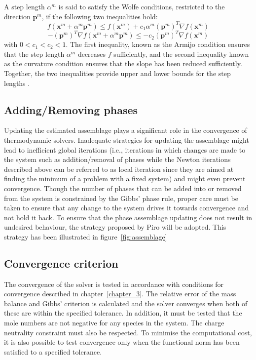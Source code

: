 	A step length $\alpha^m$ is said to satisfy the Wolfe conditions, restricted to the direction $\mathbf{p}^m$, if the following two inequalities hold:
	\begin{equation}
		f\left(\mathbf{x}^m + \alpha^m \mathbf{p}^m\right) \leq f\left(\mathbf{x}^m \right) + c_1 \alpha^m \left(\mathbf{p}^m\right)^T \nabla f\left(\mathbf{x}^m \right)
	\end{equation}
	\begin{equation}
		- \left(\mathbf{p}^m\right)^T \nabla f\left(\mathbf{x}^m + \alpha^m \mathbf{p}^m\right) \leq - c_2 \left(\mathbf{p}^m\right)^T \nabla f\left(\mathbf{x}^m \right)
	\end{equation}
	with $0 < c_1 < c_2 < 1$. The first inequality, known as the Armijo condition ensures that the step length $\alpha^m$ decreases $f$ sufficiently, and the second inequality known as the curvature condition ensures that the slope has been reduced sufficiently. Together, the two inequalities provide upper and lower bounds for the step lengths \cite{Nocedal06}.

	\subsection{Adding/Removing phases}
		Updating the estimated assemblage plays a significant role in the convergence of thermodynamic solvers. Inadequate strategies for updating the assemblage might lead to inefficient global iterations (i.e., iterations in which changes are made to the system such as addition/removal of phases while the Newton iterations described above can be referred to as local iteration since they are aimed at finding the minimum of a problem with a fixed system) and might even prevent convergence. Though the number of phases that can be added into or removed from the system is constrained by the Gibbs' phase rule, proper care must be taken to ensure that any change to the system drives it towards convergence and not hold it back. To ensure that the phase assemblage updating does not result in undesired behaviour, the strategy proposed by Piro \cite{Piro17} will be adopted. This strategy has been illustrated in figure~\ref{fig:assemblage}

	\subsection{Convergence criterion}
	The convergence of the solver is tested in accordance with conditions for convergence described in chapter~\ref{chapter_3}. The relative error of the mass balance and Gibbs' criterion is calculated  and the solver converges when both of these are within the specified tolerance. In addition, it must be tested that the mole numbers are not negative for any species in the system. The charge neutrality constraint must also be respected.  To minimise the computational cost, it is also possible to test convergence only when the functional norm has been satisfied to a specified tolerance.

